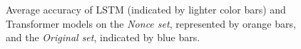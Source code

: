     

 \begin{figure}[htbp]
\caption{Average accuracy of LSTM (indicated by lighter color bars) and Transformer models on 
 the \textit{Nonce set}, represented by orange bars, and the \textit{Original set}, indicated by blue bars.} \label{fig:nonce_heuristics}
\end{figure} 

